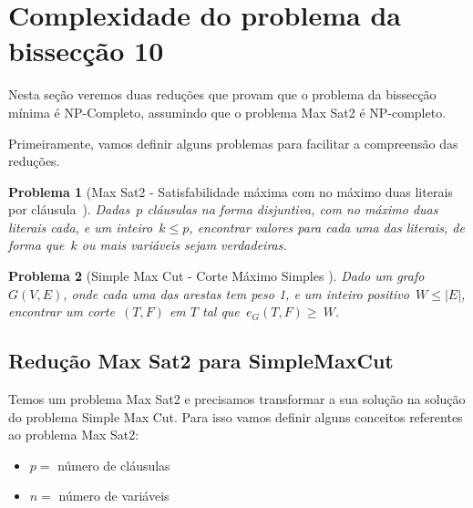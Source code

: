 \documentclass[a4paper,12pt]{article}
\newtheorem{prob}{Problema}
\begin{document}
\newpage
\section {Complexidade do problema da bissecção 10}
	Nesta seção veremos duas reduções que provam que o problema 
	da bissecção mínima é NP-Completo, assumindo
	que o problema Max Sat2 é NP-completo.

	Primeiramente, vamos definir alguns problemas para facilitar
	a compreensão das reduções.

	\medskip

	\begin{prob}[Max Sat2 - Satisfabilidade máxima com no máximo 
	duas literais por cláusula{~\cite{GareyJS76}}]
		Dadas~$p$ cláusulas na forma disjuntiva, com no máximo
		duas literais cada, e um inteiro~$k\le p$,
		encontrar valores para cada uma das literais, de forma
		que~$k$ ou mais variáveis sejam verdadeiras.

	\end{prob}

	\medskip

	\begin{prob}[Simple Max Cut - Corte Máximo Simples 
]
		Dado um grafo~$G(V,E)$, onde cada uma das arestas tem 
		peso 1, e um inteiro positivo~$W\le|E|$, encontrar um
		corte~$(T,F)$ em $T$ tal 
		que~$e_G(T,F)\ge~W$.
		
	\end{prob}

	

		

	\bigskip
	\bigskip
	\bigskip

	\subsection{Redução Max Sat2 para SimpleMaxCut}

		Temos um problema Max Sat2 e precisamos transformar
		a sua solução na solução do problema Simple Max Cut.
		Para isso vamos definir alguns conceitos referentes
		ao problema Max Sat2:
		\begin{itemize}
			\item $p = $ número de cláusulas
			\item $n = $ número de variáveis
		\end{itemize}
\end{document}
